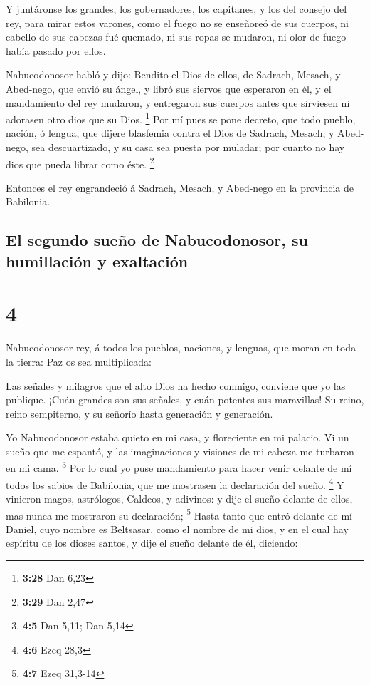  Y juntáronse los grandes, los gobernadores, los
capitanes, y los del consejo del rey, para mirar estos varones, como el
fuego no se enseñoreó de sus cuerpos, ni cabello de sus cabezas fué
quemado, ni sus ropas se mudaron, ni olor de fuego había pasado por
ellos.

 Nabucodonosor habló y dijo: Bendito el Dios de ellos, de
Sadrach, Mesach, y Abed-nego, que envió su ángel, y libró sus siervos
que esperaron en él, y el mandamiento del rey mudaron, y entregaron sus
cuerpos antes que sirviesen ni adorasen otro dios que su Dios.
\footnote{\textbf{3:28} Dan 6,23}  Por mí pues se pone
decreto, que todo pueblo, nación, ó lengua, que dijere blasfemia contra
el Dios de Sadrach, Mesach, y Abed-nego, sea descuartizado, y su casa
sea puesta por muladar; por cuanto no hay dios que pueda librar como
éste. \footnote{\textbf{3:29} Dan 2,47}

 Entonces el rey engrandeció á Sadrach, Mesach, y
Abed-nego en la provincia de Babilonia.

\hypertarget{el-segundo-sueuxf1o-de-nabucodonosor-su-humillaciuxf3n-y-exaltaciuxf3n}{%
\subsection{El segundo sueño de Nabucodonosor, su humillación y
exaltación}\label{el-segundo-sueuxf1o-de-nabucodonosor-su-humillaciuxf3n-y-exaltaciuxf3n}}

\hypertarget{section-3}{%
\section{4}\label{section-3}}

 Nabucodonosor rey, á todos los pueblos, naciones, y
lenguas, que moran en toda la tierra: Paz os sea multiplicada:

 Las señales y milagros que el alto Dios ha hecho conmigo,
conviene que yo las publique.  ¡Cuán grandes son sus
señales, y cuán potentes sus maravillas! Su reino, reino sempiterno, y
su señorío hasta generación y generación.

 Yo Nabucodonosor estaba quieto en mi casa, y floreciente
en mi palacio.  Vi un sueño que me espantó, y las
imaginaciones y visiones de mi cabeza me turbaron en mi cama.
\footnote{\textbf{4:5} Dan 5,11; Dan 5,14}  Por lo cual yo
puse mandamiento para hacer venir delante de mí todos los sabios de
Babilonia, que me mostrasen la declaración del sueño. \footnote{\textbf{4:6}
  Ezeq 28,3}  Y vinieron magos, astrólogos, Caldeos, y
adivinos: y dije el sueño delante de ellos, mas nunca me mostraron su
declaración; \footnote{\textbf{4:7} Ezeq 31,3-14}  Hasta
tanto que entró delante de mí Daniel, cuyo nombre es Beltsasar, como el
nombre de mi dios, y en el cual hay espíritu de los dioses santos, y
dije el sueño delante de él, diciendo:

